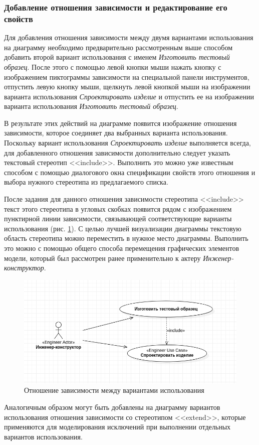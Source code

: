 \documentclass[a4paper,12pt]{report}
\begin{document}
\subsubsection*{Добавление отношения зависимости и редактирование его свойств}
Для добавления отношения зависимости между двумя вариантами использования на диаграмму необходимо предварительно рассмотренным выше способом добавить второй вариант использования с именем \textit{Изготовить тестовый образец}. После этого с помощью левой кнопки мыши нажать кнопку с изображением пиктограммы зависимости на специальной панели инструментов, отпустить левую кнопку мыши, щелкнуть левой кнопкой мыши на изображении варианта использования \textit{Спроектировать изделие} и отпустить ее на изображении варианта использования \textit{Изготовить тестовый образец}. 

В результате этих действий на диаграмме появится изображение отношения зависимости, которое соединяет два выбранных варианта использования.
Поскольку вариант использования \textit{Спроектировать изделие} выполняется всегда, для добавленного отношения зависимости дополнительно следует указать текстовый стереотип <<include>>. Выполнить это можно уже известным способом с помощью диалогового окна спецификации свойств этого отношения и выбора нужного стереотипа из предлагаемого списка.

После задания для данного отношения зависимости стереотипа <<include>> текст этого стереотипа в угловых скобках появится рядом с изображением пунктирной линии зависимости, связывающей соответствующие варианты использования (рис. \ref{fig:actionsinclude}). С целью лучшей визуализации диаграммы текстовую область стереотипа можно переместить в нужное место диаграммы. Выполнить это можно с помощью общего способа перемещения графических элементов модели, который был рассмотрен ранее применительно к актеру \textit{Инженер-конструктор}.
\newpage
\begin{figure}[h!]
	\centering
	\includegraphics[width=0.7\linewidth]{images/actionsinclude}
	\caption{Отношение зависимости между вариантами использования}
	\label{fig:actionsinclude}
\end{figure}
Аналогичным образом могут быть добавлены на диаграмму вариантов использования отношения зависимости со стереотипом <<extend>>, которые применяются для моделирования исключений при выполнении отдельных вариантов использования.
\end{document}

